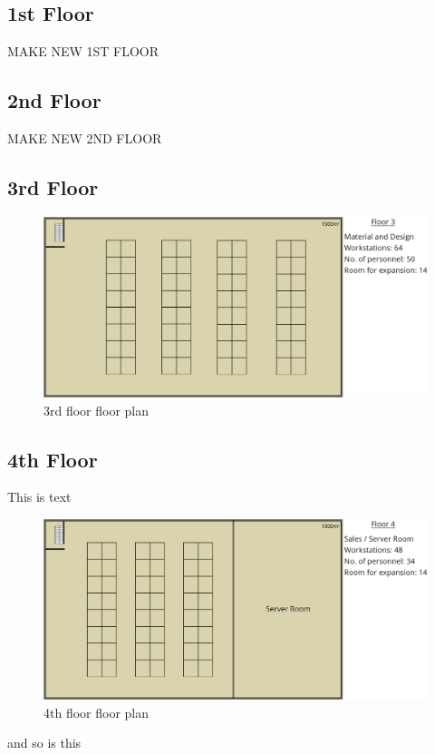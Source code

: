 \subsection{1st Floor}
\begin{huge}
    MAKE NEW 1ST FLOOR
\end{huge}
\subsection{2nd Floor}
\begin{huge}
    MAKE NEW 2ND FLOOR
\end{huge}
\subsection{3rd Floor}
\begin{figure}[h]
    \includegraphics[width=15cm]{Figures/3rd-Floor.png}
    \caption{3rd floor floor plan}
    \label{3rd_floor}
\end{figure}
\subsection{4th Floor}
This is text
\begin{figure}[h]
    \includegraphics[width=15cm]{Figures/4th-Floor.png}
    \caption{4th floor floor plan}
    \label{4th_floor}
\end{figure}
and so is this
